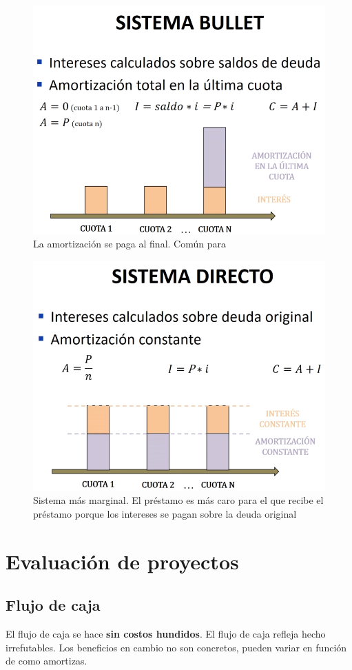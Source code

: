 \documentclass[twocolumn,10pt]{article}
\begin{document}
\begin{figure}
	\centering
	\includegraphics[width=0.7\linewidth]{fig/sist_bullet.png}
	\caption{La amortización se paga al final. Común para }
	\label{fig:sit_bullet}
\end{figure}

\begin{figure}
	\centering
	\includegraphics[width=0.7\linewidth]{fig/sit_directo.png}
	\caption{Sistema más marginal. El préstamo es más caro para el que recibe el préstamo porque los intereses se pagan sobre la deuda original}
	\label{fig:sit_directo}
\end{figure}


\section{Evaluación de proyectos}

\subsection{Flujo de caja}
El flujo de caja se hace \textbf{sin costos hundidos}. El flujo de caja refleja hecho irrefutables. Los beneficios en cambio no son concretos, pueden variar en función de como amortizas.
\end{document}
